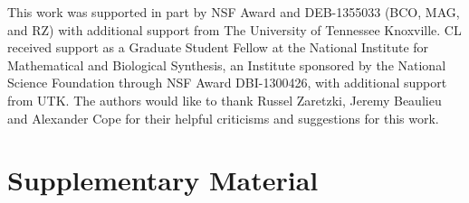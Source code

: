 This work was supported in part by NSF Award and DEB-1355033 (BCO, MAG, and RZ) with additional support from The University of Tennessee Knoxville. 
CL received support as a Graduate Student Fellow at the National Institute for Mathematical and Biological Synthesis, an Institute sponsored by the National Science Foundation through NSF Award DBI-1300426, with additional support from UTK. 
The authors would like to thank Russel Zaretzki, Jeremy Beaulieu and Alexander Cope for their helpful criticisms and suggestions for this work.




%
%

\clearpage
\section{Supplementary Material}

